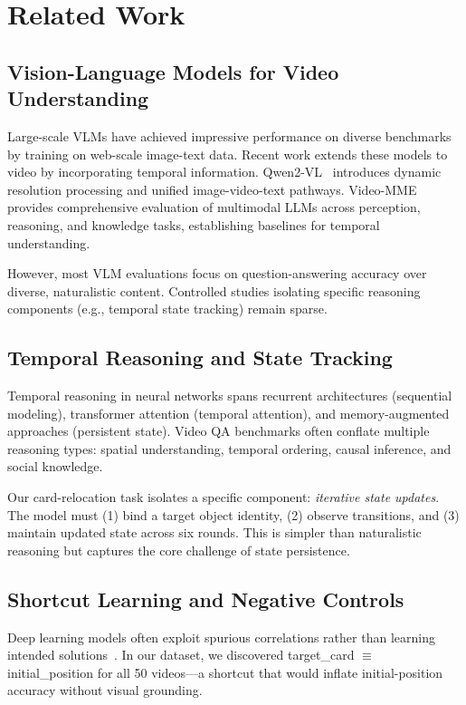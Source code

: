 \section{Related Work}
\label{sec:related}

\subsection{Vision-Language Models for Video Understanding}

Large-scale VLMs have achieved impressive performance on diverse benchmarks by training on web-scale image-text data. Recent work extends these models to video by incorporating temporal information. Qwen2-VL~\cite{wang2024qwen} introduces dynamic resolution processing and unified image-video-text pathways. Video-MME~\cite{fu2024video} provides comprehensive evaluation of multimodal LLMs across perception, reasoning, and knowledge tasks, establishing baselines for temporal understanding.

However, most VLM evaluations focus on question-answering accuracy over diverse, naturalistic content. Controlled studies isolating specific reasoning components (e.g., temporal state tracking) remain sparse.

\subsection{Temporal Reasoning and State Tracking}

Temporal reasoning in neural networks spans recurrent architectures (sequential modeling), transformer attention (temporal attention), and memory-augmented approaches (persistent state). Video QA benchmarks often conflate multiple reasoning types: spatial understanding, temporal ordering, causal inference, and social knowledge.

Our card-relocation task isolates a specific component: \emph{iterative state updates}. The model must (1) bind a target object identity, (2) observe transitions, and (3) maintain updated state across six rounds. This is simpler than naturalistic reasoning but captures the core challenge of state persistence.

\subsection{Shortcut Learning and Negative Controls}

Deep learning models often exploit spurious correlations rather than learning intended solutions~\cite{geirhos2020shortcut}. In our dataset, we discovered target\_card $\equiv$ initial\_position for all 50 videos---a shortcut that would inflate initial-position accuracy without visual grounding.


